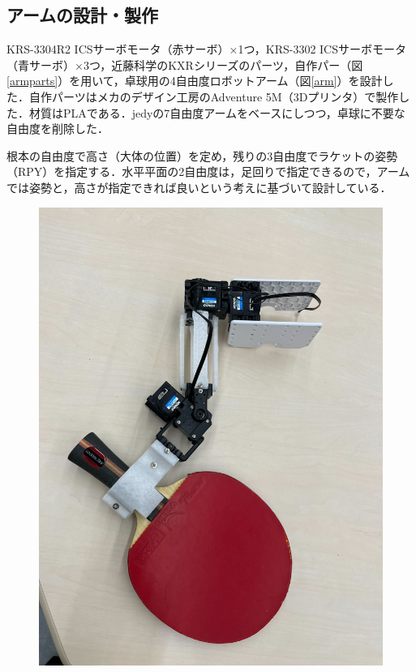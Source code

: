 \documentclass[10pt, oneside, titlepage]{ltjarticle}  %
\begin{document}
  \subsection{アームの設計・製作}
  KRS-3304R2 ICSサーボモータ（赤サーボ）×1つ，KRS-3302 ICSサーボモータ（青サーボ）×3つ，近藤科学のKXRシリーズのパーツ，自作パー（図\ref{armparts}）を用いて，卓球用の4自由度ロボットアーム（図\ref{arm}）を設計した．自作パーツはメカのデザイン工房のAdventure 5M（3Dプリンタ）で製作した．材質はPLAである．jedyの7自由度アームをベースにしつつ，卓球に不要な自由度を削除した．

  根本の自由度で高さ（大体の位置）を定め，残りの3自由度でラケットの姿勢（RPY）を指定する．水平平面の2自由度は，足回りで指定できるので，アームでは姿勢と，高さが指定できれば良いという考えに基づいて設計している．
  \begin{figure}[H]
    \centering
    \begin{minipage}{0.48\textwidth}
      \centering
      \includegraphics[width=\textwidth]{figures/arm.jpg}

\end{minipage}
\end{figure}
\end{document}
